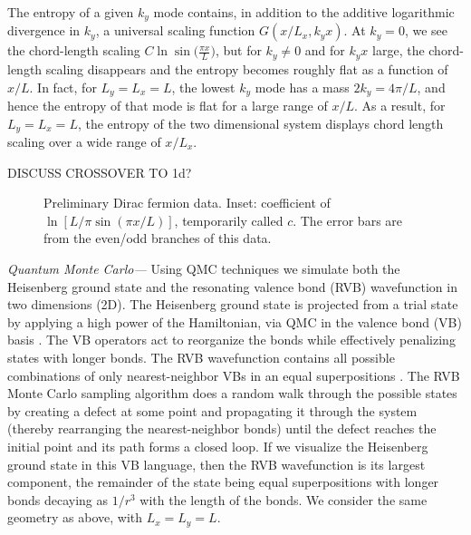 \documentclass[prl,aps,twocolumn,floatfix,amsmath,amssymb,superscriptaddress,tightenlines]{revtex4}
\begin{document}
The entropy of a given $k_y$ mode contains, in addition to the additive logarithmic divergence in $k_y$, a universal scaling function $G(x/L_x,k_y x)$.  At $k_y=0$, we see the chord-length scaling $C \ln\sin\big( \frac{\pi x}{L} \big)$, but for $k_y \neq 0$ and for $k_y x$ large, the chord-length scaling disappears and the entropy becomes roughly flat as a function of $x/L$.  In fact, for $L_y=L_x=L$, the lowest $k_y$ mode has a mass $2 k_y=4\pi/L$, and hence the entropy of that mode is flat for a large range of $x/L$.  As a result, for $L_y=L_x=L$, the entropy of the two dimensional system displays chord length scaling over a wide range of $x/L_x$.

DISCUSS CROSSOVER TO 1d?

 \begin{figure}[ht]
   \begin{center}
   \end{center}
   \caption{Preliminary Dirac fermion data. Inset: coefficient of $\ln\left[ L/\pi \sin( \pi x/L ) \right]$, temporarily called $c$. The error bars are from the even/odd branches of this data.}
   \label{fig:dirac}
 \end{figure}
 
{\it Quantum Monte Carlo---}
Using QMC techniques we simulate both the
Heisenberg ground state and the resonating valence bond (RVB)
wavefunction in two dimensions (2D).  The Heisenberg ground state is
projected from a trial state by applying a high power of the
Hamiltonian, via QMC in the valence bond (VB)
basis \cite{Sandvik}. The VB operators act to reorganize the
bonds while effectively penalizing states with longer bonds.  The RVB
wavefunction contains all possible combinations of only
nearest-neighbor VBs in an equal superpositions \cite{RVB1,RVB2}.  The RVB 
Monte Carlo sampling
algorithm does a random walk through the possible states by creating a
defect at some point and propagating it through the system (thereby
rearranging the nearest-neighbor bonds) until the defect reaches the
initial point and its path forms a closed loop.
If we visualize the Heisenberg ground state in this VB language, then the RVB wavefunction is its largest component, the remainder of the state being equal superpositions with longer bonds decaying as $1/r^3$ \cite{Sandvik} with the length of the bonds.
We consider the same geometry as above, with $L_x=L_y=L$.
\end{document}
